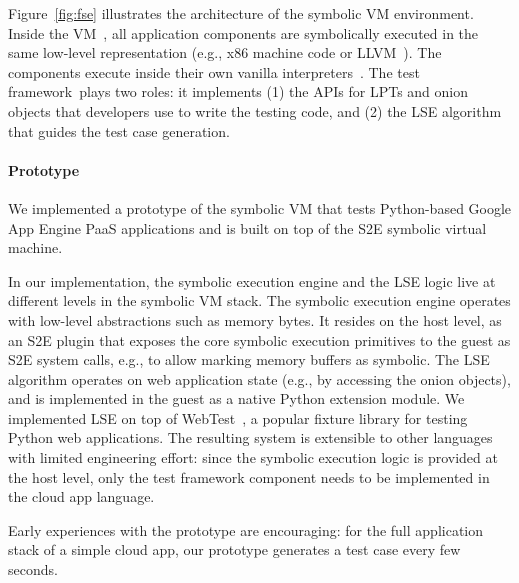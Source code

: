 Figure~\ref{fig:fse} illustrates the architecture of the symbolic VM environment.  Inside the VM~\cI, all application components are symbolically executed in the same low-level representation (e.g., x86 machine code or LLVM~\cite{llvm}).  The components execute inside their own vanilla interpreters~\cII.
%
The test framework~\cIII plays two roles: it implements (1) the APIs for LPTs and onion objects that developers use to write the testing code, and (2) the LSE algorithm that guides the test case generation.

\paragraph{Prototype}

We implemented a prototype of the symbolic VM that tests Python-based Google App Engine PaaS applications and is built on top of the S2E symbolic virtual machine.

In our implementation, the symbolic execution engine and the LSE logic live at different levels in the symbolic VM stack.
%
The symbolic execution engine operates with low-level abstractions such as memory bytes. It resides on the host level, as an S2E plugin that exposes the core symbolic execution primitives to the guest as S2E system calls, e.g., to allow marking memory buffers as symbolic.
%
The LSE algorithm operates on web application state (e.g., by accessing the onion objects), and is implemented in the guest as a native Python extension module.  We implemented LSE on top of WebTest~\cite{py-webtest}, a popular fixture library for testing Python web applications.
%
The resulting system is extensible to other languages with limited engineering effort: since the symbolic execution logic is provided at the host level, only the test framework component needs to be implemented in the cloud app language.

Early experiences with the prototype are encouraging: for the full application stack of a simple cloud app, our prototype generates a test case every few seconds.

